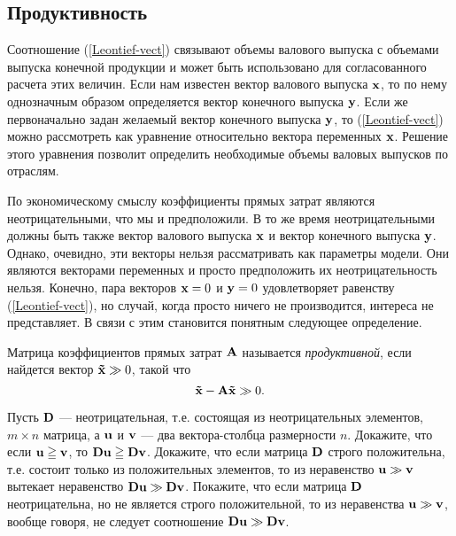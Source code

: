 \subsection{Продуктивность}
    Соотношение (\ref{Leontief-vect}) связывают объемы валового выпуска с
    объемами выпуска конечной продукции и может быть использовано
    для согласованного расчета этих величин. Если нам известен
    вектор валового выпуска $\mathbf{x}$, то по нему однозначным образом
    определяется вектор конечного выпуска $\mathbf{y}$. Если же
    первоначально задан желаемый вектор конечного выпуска $\mathbf{y}$,
    то (\ref{Leontief-vect}) можно рассмотреть как уравнение
    относительно вектора переменных $\mathbf{x}$. Решение этого уравнения
    позволит определить необходимые объемы валовых выпусков по отраслям.

    По экономическому смыслу коэффициенты прямых затрат являются
    неотрицательными, что мы и предположили. В то же время
    неотрицательными должны быть также вектор валового выпуска
    $\mathbf{x}$ и вектор конечного выпуска $\mathbf{y}$. Однако, очевидно, эти
    векторы нельзя рассматривать как параметры модели. Они
    являются векторами переменных и просто предположить их
    неотрицательность нельзя. Конечно, пара векторов $\mathbf{x}=0$ и
    $\mathbf{y}=0$ удовлетворяет равенству (\ref{Leontief-vect}), но
    случай, когда просто ничего не производится, интереса не
    представляет. В связи с этим становится понятным
    следующее определение.

    Матрица коэффициентов прямых затрат $\mathbf{A}$ называется
    \emph{продуктивной}, если найдется вектор $\mathbf{\tilde{x}}\gg0$,
    такой что
    \[\mathbf{\tilde{x}}-\mathbf{A}\mathbf{\tilde{x}}\gg0.\]

\begin{exer} \label{monot-neotr-matr}
    Пусть $\mathbf{D}$ --- неотрицательная, т.е. состоящая
    из неотрицательных элементов, $m\times n$ матрица, а $\mathbf{u}$ и
    $\mathbf{v}$ --- два вектора-столбца размерности $n$.
       Докажите, что если $\mathbf{u}\geqq\mathbf{v}$, то
    $\mathbf{D}\mathbf{u}\geqq\mathbf{D}\mathbf{v}$.
    Докажите, что если матрица $\mathbf{D}$ строго положительна, т.е.
    состоит только  из положительных элементов, то из
    неравенство $\mathbf{u}\gg\mathbf{v}$ вытекает неравенство
    $\mathbf{D}\mathbf{u}\gg\mathbf{D}\mathbf{v}$. Покажите, что если матрица
    $\mathbf{D}$ неотрицательна, но не является строго положительной, то
    из неравенства $\mathbf{u}\gg\mathbf{v}$, вообще говоря, не следует
    соотношение $\mathbf{D}\mathbf{u}\gg\mathbf{D}\mathbf{v}$.

\end{exer}



